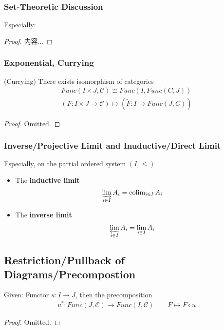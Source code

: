 \documentclass[Total.tex]{subfiles}
\begin{document}
				
				\subsubsection{Set-Theoretic Discussion}
				
					\begin{proposition}
						Especially:
					\end{proposition}
					\begin{proof}
						内容...
					\end{proof}
					
					
				\subsubsection{Exponential, Currying}
					\begin{theorem}
						(Currying) There exists isomorphism of categories
						\begin{gather*}
							Func(I\times J,\mathcal{C})\cong Func(I,Func(C,J))\\
							(F:I\times J\rightarrow \mathcal{C})\mapsto (\tilde{F}:I\rightarrow Func(J,C))
						\end{gather*}
					\end{theorem}
					\begin{proof}
						Omitted.
					\end{proof}
			
				\subsubsection{Inverse/Projective Limit and Inuductive/Direct Limit}
					\begin{Def}
						Especially, on the partial ordered system $(I,\leq)$
						\begin{itemize}
							\item The \textbf{inductive limit}
							\begin{gather*}
								\varinjlim_{i\in I} A_i=\operatorname{colim}_{i\in I} A_i
							\end{gather*}
							\item The \textbf{inverse limit}
							\begin{gather*}
								\varprojlim_{i\in I} A_i=\lim_{i\in I} A_i
							\end{gather*}
						\end{itemize}
					\end{Def}
			\subsection{Restriction/Pullback of Diagrams/Precompostion}
			\begin{proposition}
				Given: Functor $u:I\rightarrow J$, then the precomposition
				\begin{gather*}
					u^*:Func(J,\mathcal{C})\rightarrow Func(I,\mathcal{C})\qquad F\mapsto  F\circ u
				\end{gather*}
			\end{proposition}
			\begin{proof}
				Omitted. 
			\end{proof}
			
\end{document}
